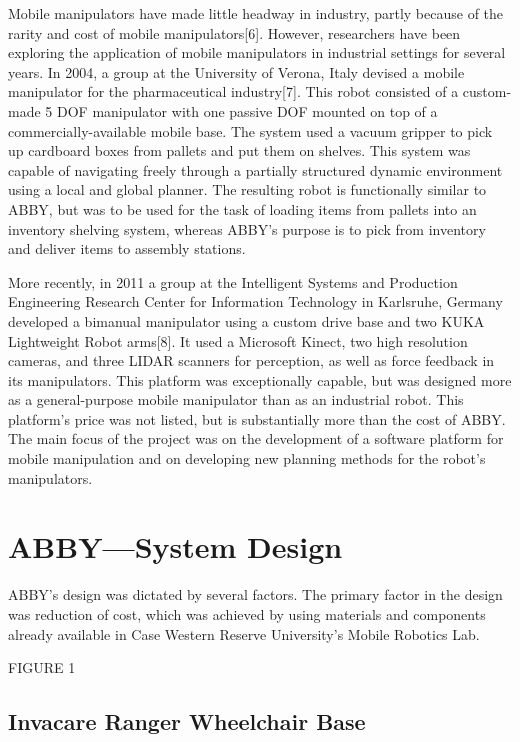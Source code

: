 \documentclass[]{cwru} %
\begin{document}
Mobile manipulators have made little headway in industry, partly because
of the rarity and cost of mobile manipulators{[}6{]}. However,
researchers have been exploring the application of mobile manipulators
in industrial settings for several years. In 2004, a group at the
University of Verona, Italy devised a mobile manipulator for the
pharmaceutical industry{[}7{]}. This robot consisted of a custom-made 5
DOF manipulator with one passive DOF mounted on top of a
commercially-available mobile base. The system used a vacuum gripper to
pick up cardboard boxes from pallets and put them on shelves. This
system was capable of navigating freely through a partially structured
dynamic environment using a local and global planner. The resulting
robot is functionally similar to ABBY, but was to be used for the task
of loading items from pallets into an inventory shelving system, whereas
ABBY's purpose is to pick from inventory and deliver items to assembly
stations.

More recently, in 2011 a group at the Intelligent Systems and Production
Engineering Research Center for Information Technology in Karlsruhe,
Germany developed a bimanual manipulator using a custom drive base and
two KUKA Lightweight Robot arms{[}8{]}. It used a Microsoft Kinect, two
high resolution cameras, and three LIDAR scanners for perception, as
well as force feedback in its manipulators. This platform was
exceptionally capable, but was designed more as a general-purpose mobile
manipulator than as an industrial robot. This platform's price was not
listed, but is substantially more than the cost of ABBY. The main focus
of the project was on the development of a software platform for mobile
manipulation and on developing new planning methods for the robot's
manipulators.


\chapter{ABBY---System Design}

ABBY's design was dictated by several factors. The primary factor in the
design was reduction of cost, which was achieved by using materials and
components already available in Case Western Reserve University's Mobile
Robotics Lab.

FIGURE 1

\section{Invacare Ranger Wheelchair Base}
\end{document}

